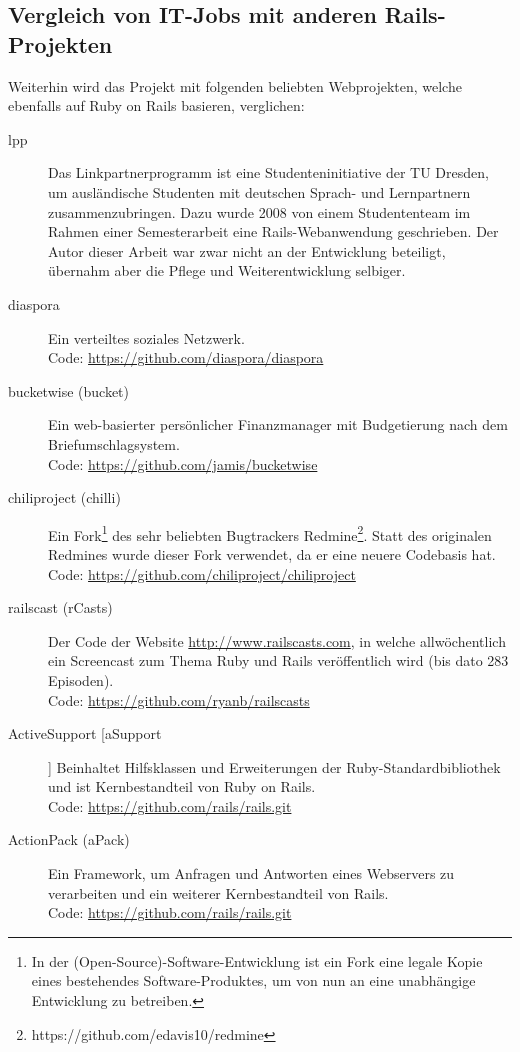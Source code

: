 \subsection{Vergleich von IT-Jobs mit anderen Rails-Projekten}
Weiterhin wird das Projekt mit folgenden beliebten Webprojekten, welche ebenfalls auf Ruby on Rails basieren, verglichen:
\begin{description}
\item[lpp] Das Linkpartnerprogramm ist eine Studenteninitiative der TU Dresden, um ausländische Studenten mit deutschen Sprach- und Lernpartnern zusammenzubringen. Dazu wurde 2008 von einem Studententeam im Rahmen einer Semesterarbeit eine Rails-Webanwendung geschrieben. Der Autor dieser Arbeit war zwar nicht an der Entwicklung beteiligt, übernahm aber die Pflege und Weiterentwicklung selbiger.
 \item[diaspora] Ein verteiltes soziales Netzwerk. \\
 Code: \url{https://github.com/diaspora/diaspora}
 \item[bucketwise (bucket)] Ein web-basierter persönlicher Finanzmanager mit Budgetierung nach dem Briefumschlagsystem.\\
 Code: \url{https://github.com/jamis/bucketwise}
 \item[chiliproject (chilli)] Ein Fork\footnote{In der (Open-Source)-Software-Entwicklung ist ein Fork eine legale Kopie eines bestehendes Software-Produktes, um von nun an eine unabhängige Entwicklung zu betreiben.} des sehr beliebten Bugtrackers Redmine\footnote{https://github.com/edavis10/redmine}. Statt des originalen Redmines wurde dieser Fork verwendet, da er eine neuere Codebasis hat.\\
 Code: \url{https://github.com/chiliproject/chiliproject}
 \item[railscast (rCasts)] Der Code der Website \url{http://www.railscasts.com}, in welche allwöchentlich ein Screencast zum Thema Ruby und Rails veröffentlich wird (bis dato 283 Episoden).\\
 Code: \url{https://github.com/ryanb/railscasts}
 \item[ActiveSupport [aSupport]] Beinhaltet Hilfsklassen und Erweiterungen der Ruby-Standardbibliothek und ist Kernbestandteil von Ruby on Rails. \\
 Code: \url{https://github.com/rails/rails.git}
 \item[ActionPack (aPack)] Ein Framework, um Anfragen und Antworten eines Webservers zu verarbeiten und ein weiterer Kernbestandteil von Rails.\\
 Code: \url{https://github.com/rails/rails.git}
\end{description}

